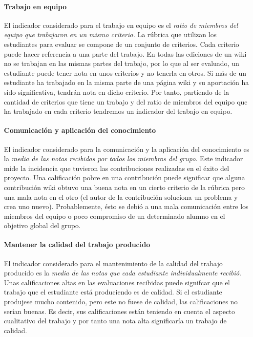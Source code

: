 \paragraph*{Trabajo en equipo}
El indicador considerado para el trabajo en equipo es el \emph{ratio de miembros del equipo que trabajaron en un mismo criterio.} La rúbrica que utilizan los estudiantes para evaluar se compone de un conjunto de criterios. Cada criterio puede hacer referencia a una parte del trabajo. En todas las ediciones de un wiki no se trabajan en las mismas partes del trabajo, por lo que al ser evaluado, un estudiante puede tener nota en unos criterios y no tenerla en otros. Si más de un estudiante ha trabajado en la misma parte de una página wiki y su aportación ha sido significativa, tendrán nota en dicho criterio. Por tanto, partiendo de la cantidad de criterios que tiene un trabajo y del ratio de miembros del equipo que ha trabajado en cada criterio tendremos un indicador del trabajo en equipo.

\paragraph*{Comunicación y aplicación del conocimiento}
El indicador considerado para la comunicación y la aplicación del conocimiento es la \emph{media de las notas recibidas por todos los miembros del grupo}. Este indicador mide la incidencia que tuvieron las contribuciones realizadas en el éxito del proyecto. Una calificación pobre en una contribución puede significar  que alguna contribución wiki obtuvo una buena nota en un cierto criterio de la rúbrica pero una mala nota en el otro (el autor de la contribución soluciona un problema y crea uno nuevo). Probablemente, ésto se debió a una mala comunicación entre los miembros del equipo o poco compromiso de un determinado alumno en el objetivo global del grupo. 

\paragraph*{Mantener la calidad del trabajo producido}
El indicador considerado para el mantenimiento de la calidad del trabajo producido es la \emph{media de las notas que cada estudiante individualmente recibió}. Unas calificaciones altas en las evaluaciones recibidas puede signifcar que el trabajo que el estudiante está produciendo es de calidad. Si el estudiante produjese mucho contenido, pero este no fuese de calidad, las calificaciones no serían buenas. Es decir, sus calificaciones están teniendo en cuenta el aspecto cualitativo del trabajo y por tanto una nota alta significaría un trabajo de calidad.

